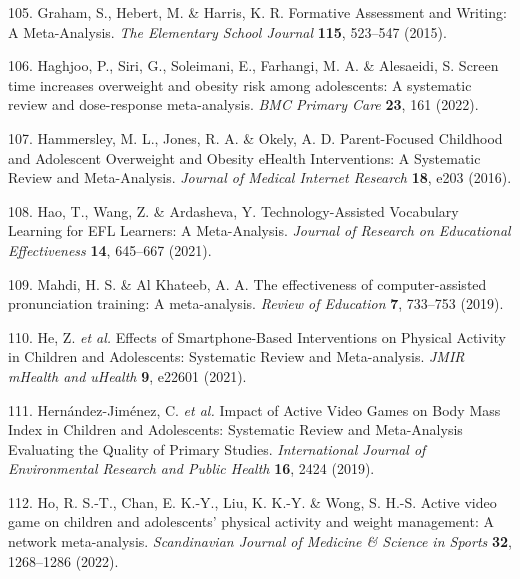\documentclass[
  english,
  man]{apa6}
\newenvironment{cslreferences}%
  {}%
  {\par}
\begin{document}
\begin{cslreferences}
\leavevmode\hypertarget{ref-grahamFormativeAssessmentWriting2015}{}%
105. Graham, S., Hebert, M. \& Harris, K. R. Formative Assessment and Writing: A Meta-Analysis. \emph{The Elementary School Journal} \textbf{115}, 523--547 (2015).

\leavevmode\hypertarget{ref-haghjooScreenTimeIncreases2022}{}%
106. Haghjoo, P., Siri, G., Soleimani, E., Farhangi, M. A. \& Alesaeidi, S. Screen time increases overweight and obesity risk among adolescents: A systematic review and dose-response meta-analysis. \emph{BMC Primary Care} \textbf{23}, 161 (2022).

\leavevmode\hypertarget{ref-hammersleyParentfocusedChildhoodAdolescent2016}{}%
107. Hammersley, M. L., Jones, R. A. \& Okely, A. D. Parent-Focused Childhood and Adolescent Overweight and Obesity eHealth Interventions: A Systematic Review and Meta-Analysis. \emph{Journal of Medical Internet Research} \textbf{18}, e203 (2016).

\leavevmode\hypertarget{ref-haoTechnologyAssistedVocabularyLearning2021}{}%
108. Hao, T., Wang, Z. \& Ardasheva, Y. Technology-Assisted Vocabulary Learning for EFL Learners: A Meta-Analysis. \emph{Journal of Research on Educational Effectiveness} \textbf{14}, 645--667 (2021).

\leavevmode\hypertarget{ref-mahdiEffectivenessComputerAssisted2019}{}%
109. Mahdi, H. S. \& Al Khateeb, A. A. The effectiveness of computer-assisted pronunciation training: A meta-analysis. \emph{Review of Education} \textbf{7}, 733--753 (2019).

\leavevmode\hypertarget{ref-heEffectsSmartphoneBasedInterventions2021}{}%
110. He, Z. \emph{et al.} Effects of Smartphone-Based Interventions on Physical Activity in Children and Adolescents: Systematic Review and Meta-analysis. \emph{JMIR mHealth and uHealth} \textbf{9}, e22601 (2021).

\leavevmode\hypertarget{ref-hernandez-jimenezImpactActiveVideo2019}{}%
111. Hernández-Jiménez, C. \emph{et al.} Impact of Active Video Games on Body Mass Index in Children and Adolescents: Systematic Review and Meta-Analysis Evaluating the Quality of Primary Studies. \emph{International Journal of Environmental Research and Public Health} \textbf{16}, 2424 (2019).

\leavevmode\hypertarget{ref-hoActiveVideoGame2022}{}%
112. Ho, R. S.-T., Chan, E. K.-Y., Liu, K. K.-Y. \& Wong, S. H.-S. Active video game on children and adolescents' physical activity and weight management: A network meta-analysis. \emph{Scandinavian Journal of Medicine \& Science in Sports} \textbf{32}, 1268--1286 (2022).


\end{cslreferences}
\end{document}
